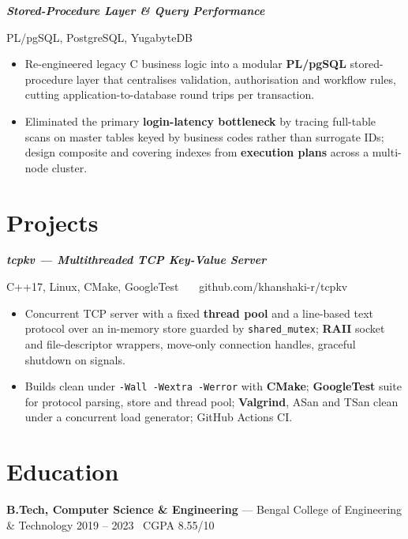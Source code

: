 \documentclass[10pt,a4paper]{article}
\newcommand{\project}[2]{\vspace{0.28em}\textit{\textbf{#1}}\par
  {\small\color{gray!80!black}#2}\par\vspace{-0.2em}}
\begin{document}
\project{Stored-Procedure Layer \& Query Performance}{PL/pgSQL, PostgreSQL, YugabyteDB}
\begin{itemize}
  \item Re-engineered legacy C business logic into a modular \textbf{PL/pgSQL} stored-procedure
        layer that centralises validation, authorisation and workflow rules, cutting
        application-to-database round trips per transaction.
  \item Eliminated the primary \textbf{login-latency bottleneck} by tracing full-table scans on
        master tables keyed by business codes rather than surrogate IDs; design composite and
        covering indexes from \textbf{execution plans} across a multi-node cluster.
\end{itemize}

\section{Projects}

\project{tcpkv --- Multithreaded TCP Key-Value Server}{C++17, Linux, CMake, GoogleTest \ \textbar\ \ github.com/khanshaki-r/tcpkv}
\begin{itemize}
  \item Concurrent TCP server with a fixed \textbf{thread pool} and a line-based text protocol over
        an in-memory store guarded by \texttt{shared\_mutex}; \textbf{RAII} socket and
        file-descriptor wrappers, move-only connection handles, graceful shutdown on signals.
  \item Builds clean under \texttt{-Wall -Wextra -Werror} with \textbf{CMake}; \textbf{GoogleTest}
        suite for protocol parsing, store and thread pool; \textbf{Valgrind}, ASan and TSan clean
        under a concurrent load generator; GitHub Actions CI.
\end{itemize}


\section{Education}

\textbf{B.Tech, Computer Science \& Engineering} --- Bengal College of Engineering \& Technology
\hfill 2019 -- 2023 \textbar\ CGPA 8.55/10
\end{document}
